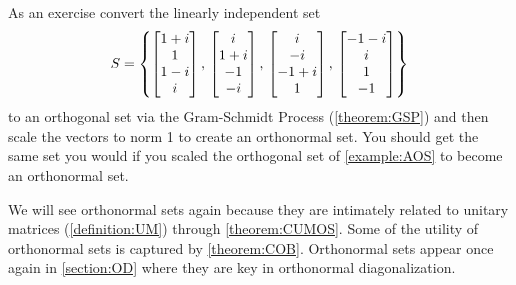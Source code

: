 \documentclass{ximera}
\begin{document}
\begin{example}
  
  As an exercise convert the linearly independent set
  \[
    S=\left\{
      \begin{bmatrix}1+i\\1\\1-i\\i\end{bmatrix},\,
      \begin{bmatrix}i\\1+i\\-1\\-i\end{bmatrix},\,
      \begin{bmatrix}i\\-i\\ -1+i\\1\end{bmatrix},\,
      \begin{bmatrix}-1-i\\i\\1\\-1\end{bmatrix}
    \right\}
  \]
  to an orthogonal set via the Gram-Schmidt Process (\ref{theorem:GSP}) and then scale the vectors to norm 1 to create an orthonormal set.  You should get the same set you would if you scaled the orthogonal set of \ref{example:AOS} to become an orthonormal set.

\end{example}

We will see orthonormal sets again because they are intimately related
to unitary matrices (\ref{definition:UM}) through \ref{theorem:CUMOS}.
Some of the utility of orthonormal sets is captured by
\ref{theorem:COB}.  Orthonormal sets appear once again in
\ref{section:OD} where they are key in orthonormal diagonalization.
\end{document}
